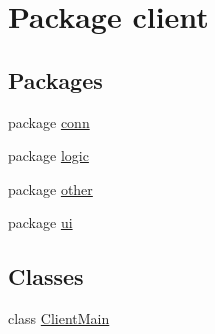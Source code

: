 \hypertarget{namespaceclient}{}\section{Package client}
\label{namespaceclient}
\subsection*{Packages}
\begin{DoxyCompactItemize}
\item 
package \hyperlink{namespaceclient_1_1conn}{conn}
\item 
package \hyperlink{namespaceclient_1_1logic}{logic}
\item 
package \hyperlink{namespaceclient_1_1other}{other}
\item 
package \hyperlink{namespaceclient_1_1ui}{ui}
\end{DoxyCompactItemize}
\subsection*{Classes}
\begin{DoxyCompactItemize}
\item 
class \hyperlink{classclient_1_1_client_main}{Client\+Main}
\end{DoxyCompactItemize}
